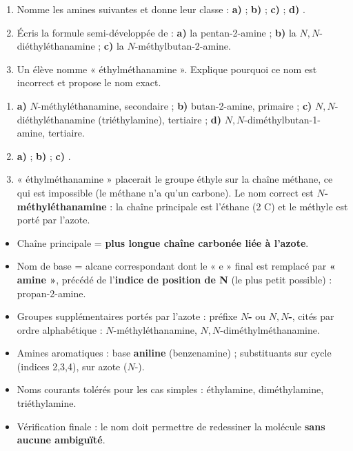 \documentclass[11pt]{article}
\begin{document}
\begin{exercice}
\begin{enumerate}
\item Nomme les amines suivantes et donne leur classe : \textbf{a)}  ; \textbf{b)}  ; \textbf{c)}  ; \textbf{d)} .
\item Écris la formule semi-développée de : \textbf{a)} la pentan-2-amine ; \textbf{b)} la $N,N$-diéthyléthanamine ; \textbf{c)} la $N$-méthylbutan-2-amine.
\item Un élève nomme  « éthylméthanamine ». Explique pourquoi ce nom est incorrect et propose le nom exact.
\end{enumerate}
\end{exercice}

\begin{corrige}[Exercice 1]
\begin{enumerate}
\item \textbf{a)} $N$-méthyléthanamine, secondaire ; \textbf{b)} butan-2-amine, primaire ; \textbf{c)} $N,N$-diéthyléthanamine (triéthylamine), tertiaire ; \textbf{d)} $N,N$-diméthylbutan-1-amine, tertiaire.
\item \textbf{a)}  ; \textbf{b)}  ; \textbf{c)} .
\item « éthylméthanamine » placerait le groupe éthyle sur la chaîne méthane, ce qui est impossible (le méthane n'a qu'un carbone). Le nom correct est \textbf{$N$-méthyléthanamine} : la chaîne principale est l'éthane (2 C) et le méthyle est porté par l'azote.
\end{enumerate}
\end{corrige}

\begin{aretenir}
\begin{itemize}
\item Chaîne principale = \textbf{plus longue chaîne carbonée liée à l'azote}.
\item Nom de base = alcane correspondant dont le « e » final est remplacé par \textbf{« amine »}, précédé de l'\textbf{indice de position de N} (le plus petit possible) : propan-2-amine.
\item Groupes supplémentaires portés par l'azote : préfixe \textbf{$N$-} ou \textbf{$N,N$-}, cités par ordre alphabétique : $N$-méthyléthanamine, $N,N$-diméthylméthanamine.
\item Amines aromatiques : base \textbf{aniline} (benzenamine) ; substituants sur cycle (indices 2,3,4), sur azote ($N$-).
\item Noms courants tolérés pour les cas simples : éthylamine, diméthylamine, triéthylamine.
\item Vérification finale : le nom doit permettre de redessiner la molécule \textbf{sans aucune ambiguïté}.
\end{itemize}
\end{aretenir}
\end{document}
